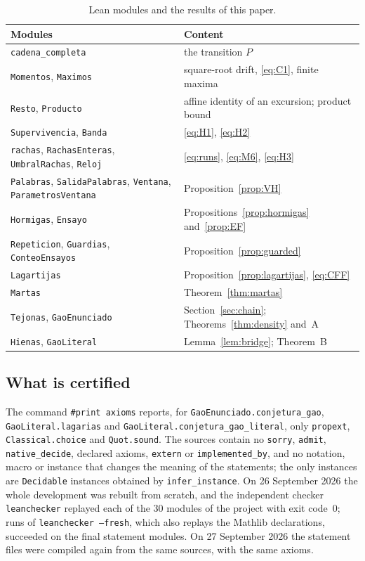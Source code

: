 \documentclass[11pt]{amsart}
\theoremstyle{definition}
\theoremstyle{remark}
\newcommand{\lean}[1]{\nolinkurl{#1}}
\begin{document}
\begin{table}[ht]
\caption{Lean modules and the results of this paper.}\label{tab:files}
\small
\begin{tabular}{@{}>{\raggedright\arraybackslash}p{}>{\raggedright\arraybackslash}p{}@{}}
\toprule
Modules & Content \\
\midrule
\lean{cadena_completa} & the transition $P$ \\
\texttt{Momentos}, \texttt{Maximos} & square-root drift, \eqref{eq:C1}, finite maxima \\
\texttt{Resto}, \texttt{Producto} & affine identity of an excursion; product bound \\
\texttt{Supervivencia}, \texttt{Banda} & \eqref{eq:H1}, \eqref{eq:H2} \\
\texttt{rachas}, \texttt{RachasEnteras}, \texttt{UmbralRachas}, \texttt{Reloj} & \eqref{eq:runs}, \eqref{eq:M6}, \eqref{eq:H3} \\
\texttt{Palabras}, \texttt{SalidaPalabras}, \texttt{Ventana}, \texttt{ParametrosVentana} & Proposition~\ref{prop:VH} \\
\texttt{Hormigas}, \texttt{Ensayo} & Propositions~\ref{prop:hormigas} and~\ref{prop:EF} \\
\texttt{Repeticion}, \texttt{Guardias}, \texttt{ConteoEnsayos} & Proposition~\ref{prop:guarded} \\
\texttt{Lagartijas} & Proposition~\ref{prop:lagartijas}, \eqref{eq:CFF} \\
\texttt{Martas} & Theorem~\ref{thm:martas} \\
\texttt{Tejonas}, \texttt{GaoEnunciado} & Section~\ref{sec:chain}; Theorems~\ref{thm:density} and~A \\
\texttt{Hienas}, \texttt{GaoLiteral} & Lemma~\ref{lem:bridge}; Theorem~B \\
\bottomrule
\end{tabular}
\end{table}

\subsection{What is certified}\label{sec:certified}
The command \texttt{\#print axioms} reports, for \lean{GaoEnunciado.conjetura_gao}, \lean{GaoLiteral.lagarias} and \lean{GaoLiteral.conjetura_gao_literal}, only \texttt{propext}, \texttt{Classical.choice} and \texttt{Quot.sound}. The sources contain no \texttt{sorry}, \texttt{admit}, \lean{native_decide}, declared axioms, \texttt{extern} or \lean{implemented_by}, and no notation, macro or instance that changes the meaning of the statements; the only instances are \texttt{Decidable} instances obtained by \lean{infer_instance}. On 26 September 2026 the whole development was rebuilt from scratch, and the independent checker \texttt{leanchecker} replayed each of the $30$ modules of the project with exit code~$0$; runs of \texttt{leanchecker --fresh}, which also replays the Mathlib declarations, succeeded on the final statement modules. On 27 September 2026 the statement files were compiled again from the same sources, with the same axioms.
\end{document}
